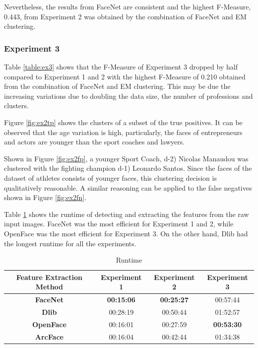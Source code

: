 \documentclass[12pt,english]{article}
\begin{document}
Nevertheless, the results from FaceNet are consistent and the highest F-Measure, 0.443, from Experiment 2 was obtained by the combination of FaceNet and EM clustering.

\subsubsection{Experiment 3}
\quad
Table \ref{table:ex3} shows that the F-Measure of Experiment 3 dropped by half compared to Experiment 1 and 2 with the highest F-Measure of 0.210 obtained from the combination of FaceNet and EM clustering. This may be due the increasing variations due to doubling the data size, the number of professions and clusters.

Figure \ref{fig:ex2tp} shows the clusters of a subset of the true positives. It can be observed that the age variation is high, particularly, the faces of entrepreneurs and actors are younger than the sport coaches and lawyers. 

Shown in Figure \ref{fig:ex2fp}, a younger Sport Coach, d-2) Nicolas Manaudou  was clustered with the fighting champion d-1) Leonardo Santos. Since the faces of the dataset of athletes consists of younger faces, this clustering decision is qualitatively reasonable. A similar reasoning can be applied to the false negatives shown in Figure \ref{fig:ex2fn}.

Table \ref{table:runtime} shows the runtime of detecting and extracting the features from the raw input images. FaceNet was the most efficient for Experiment 1 and 2, while OpenFace was the most efficient for Experiment 3. On the other hand, Dlib had the longest runtime for all the experiments.

\begin{table}[h!]
\centering
\begin{tabular}{||c c c c||} 
 \hline
Feature Extraction Method & Experiment 1 & Experiment 2 & Experiment 3\\ [0.5ex]
 \hline\hline
 \textbf{FaceNet} & \textbf{00:15:06} & \textbf{00:25:27} & 00:57:44\\ 
 \hline
  \textbf{Dlib} & 00:28:19 & 00:50:44 & 01:52:57\\
 \hline
 \textbf{OpenFace} & 00:16:01 & 00:27:59 & \textbf{00:53:30}\\
 \hline
 \textbf{ArcFace} & 00:16:04 & 00:42:44 & 01:34:38\\
 \hline
\end{tabular}
\caption{Runtime}
\label{table:runtime}
\end{table}
\end{document}
